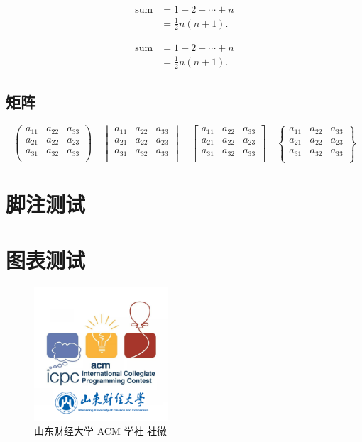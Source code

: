 \documentclass{sdufe-thesis}
\begin{document}
\begin{align}
  \text{sum} & = 1 + 2 + \cdots + n \\
             & = \frac12 n(n+1).
\end{align}

\begin{align*}
  \text{sum} & = 1 + 2 + \cdots + n \\
             & = \frac12 n(n+1).
\end{align*}

\subsection{矩阵}

\[\begin{pmatrix}
  a_{11} & a_{22} & a_{33} \\
  a_{21} & a_{22} & a_{23} \\
  a_{31} & a_{32} & a_{33} \\
\end{pmatrix} \quad
\begin{vmatrix}
  a_{11} & a_{22} & a_{33} \\
  a_{21} & a_{22} & a_{23} \\
  a_{31} & a_{32} & a_{33} \\
\end{vmatrix} \quad
\begin{bmatrix}
  a_{11} & a_{22} & a_{33} \\
  a_{21} & a_{22} & a_{23} \\
  a_{31} & a_{32} & a_{33} \\
\end{bmatrix} \quad
\begin{Bmatrix}
  a_{11} & a_{22} & a_{33} \\
  a_{21} & a_{22} & a_{23} \\
  a_{31} & a_{32} & a_{33} \\
\end{Bmatrix}\]

\section{脚注测试}




\section{图表测试}

\begin{figure}[ht]
  \centering
  \includegraphics[width = 5cm]{./logo/acm-club.png}
  \caption{山东财经大学 ACM 学社 社徽}
  \label{fig:山东财经大学 ACM 学社 社徽}
\end{figure}
\end{document}
